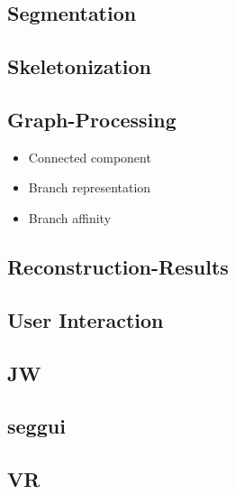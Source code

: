 \subsection{Segmentation}
\subsection{Skeletonization}
\subsection{Graph-Processing}
\begin{itemize}
\item Connected component
\item Branch representation
\item Branch affinity
\end{itemize}
\subsection{Reconstruction-Results}

\subsection{User Interaction}
\subsection{JW}
\subsection{seggui}
\subsection{VR}
